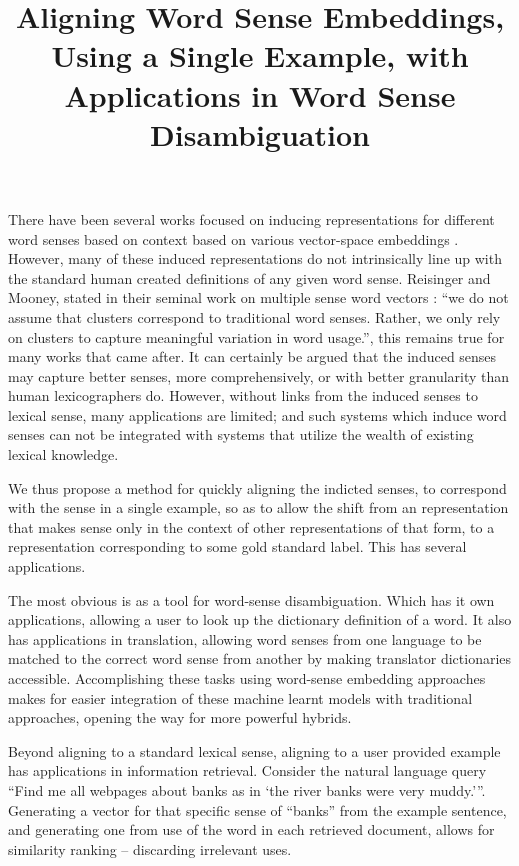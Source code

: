 \documentclass{sig-alternate}
\begin{document}
\title{Aligning Word Sense Embeddings, Using a Single Example, with Applications in Word Sense Disambiguation}
\maketitle


There have been several works focused on inducing representations for different word senses based on context based on various vector-space embeddings \parencite{Reisinger2010,Huang2012,AdaGrams,Chen2014,iacobacci2015sensembed}.
However, many of these induced representations do not intrinsically line up with the standard human created definitions of any given word sense.
Reisinger and Mooney, stated in their seminal work on multiple sense word vectors \parencite{Reisinger2010}: \enquote{we  do
not  assume  that  clusters  correspond  to  traditional
word senses. Rather, we only rely on clusters to capture meaningful variation in word usage.}, this remains true for many works that came after\parencite{Huang2012,AdaGrams}.
It can certainly be argued that the induced senses may capture better senses, more comprehensively, or with better granularity than human lexicographers do.
However, without links from the induced senses to lexical sense, many applications are limited; and such systems which induce word senses can not be integrated with systems that utilize the wealth of existing lexical knowledge.

We thus propose a method for quickly aligning the indicted senses, to correspond with the sense in a single example, so as to allow the shift from an representation that makes sense only in the context of other representations of that form, to a representation corresponding to some gold standard label. This has several applications.

The most obvious is as a tool for word-sense disambiguation. Which has it own applications, allowing a user to look up the dictionary definition of a word. It also has applications in translation, allowing word senses from one language to be matched to the correct word sense from another by making translator dictionaries accessible. 
Accomplishing these tasks using word-sense embedding approaches makes for easier integration of these machine learnt models with traditional approaches, opening the way for more powerful hybrids.

Beyond aligning to a standard lexical sense, aligning to a user provided example has applications in information retrieval. Consider the natural language query \enquote{Find me all webpages about banks as in \enquote{the river banks were very muddy.}}. Generating a vector for that specific sense of ``banks'' from the example sentence, and generating one from use of the word in each retrieved document, allows for similarity ranking -- discarding irrelevant uses. 
\end{document}
